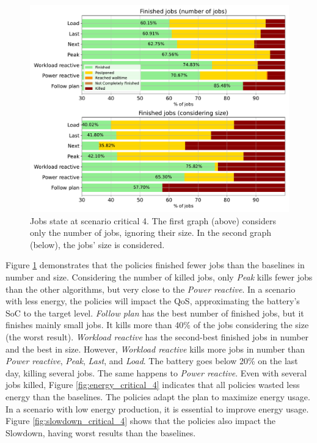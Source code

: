 \begin{figure}[!htb]
    \centering
    \includegraphics[scale=0.55]{Images/Compensations/jobs_critical_4.pdf}
    \caption[Jobs state at scenario critical 4.]{Jobs state at scenario critical 4. The first graph (above) considers only the number of jobs, ignoring their size. In the second graph (below), the jobs' size is considered.}
    \label{fig:jobs_critical_4}
\end{figure}

Figure \ref{fig:jobs_critical_4} demonstrates that the policies finished fewer jobs than the baselines in number and size. Considering the number of killed jobs, only \emph{Peak} kills fewer jobs than the other algorithms, but very close to the \emph{Power reactive}. In a scenario with less energy, the policies will impact the QoS, approximating the battery's SoC to the target level. \emph{Follow plan} has the best number of finished jobs, but it finishes mainly small jobs. It kills more than 40\% of the jobs considering the size (the worst result). \emph{Workload reactive} has the second-best finished jobs in number and the best in size. However, \emph{Workload reactive} kills more jobs in number than \emph{Power reactive}, \emph{Peak}, \emph{Last}, and \emph{Load}. The battery goes below 20\% on the last day, killing several jobs. The same happens to \emph{Power reactive}. Even with several jobs killed, Figure \ref{fig:energy_critical_4} indicates that all policies wasted less energy than the baselines. The policies adapt the plan to maximize energy usage. In a scenario with low energy production, it is essential to improve energy usage. Figure \ref{fig:slowdown_critical_4} shows that the policies also impact the Slowdown, having worst results than the baselines. 

